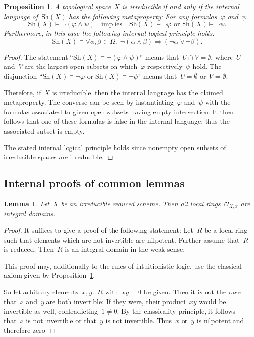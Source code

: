 \documentclass[10pt]{amsart}
\theoremstyle{definition}
\theoremstyle{plain}
\newtheorem{prop}[defn]{Proposition}
\newtheorem{lemma}[defn]{Lemma}
\theoremstyle{remark}
\renewcommand{\O}{\mathcal{O}}
\newcommand{\Sh}{\mathrm{Sh}}
\newcommand{\?}{\,{:}\,}
\renewcommand{\_}{\mathpunct{.}\,}
\begin{document}
\begin{prop}\label{prop:irreducibility-internally}
A topological space~$X$ is irreducible if and only if the internal
language of~$\Sh(X)$ has the following metaproperty: For any
formulas~$\varphi$ and~$\psi$
\[ \Sh(X) \models \neg(\varphi \wedge \psi)
  \quad\text{implies}\quad
  \Sh(X) \models \neg\varphi \text{ or }
  \Sh(X) \models \neg\psi. \]
Furthermore, in this case the following internal logical principle holds:
\[ \Sh(X) \models \forall \alpha,\beta \in \Omega\_
  \neg(\alpha \wedge \beta) \Rightarrow (\neg\alpha \vee \neg\beta). \]
\end{prop}
\begin{proof}The statement ``$\Sh(X) \models \neg(\varphi \wedge \psi)$'' means
that~$U \cap V = \emptyset$, where~$U$ and~$V$ are the largest open subsets on
which~$\varphi$ respectively~$\psi$ hold. The disjunction ``$\Sh(X) \models
\neg\varphi$ or $\Sh(X) \models \neg\psi$'' means that~$U = \emptyset$ or~$V =
\emptyset$.

Therefore, if~$X$ is irreducible, then the internal language has the claimed metaproperty. The converse
can be seen by instantiating~$\varphi$ and~$\psi$ with the formulas associated
to given open subsets having empty intersection. It then follows that one of
these formulas is false in the internal language; thus the associated subset is
empty.

The stated internal logical principle holds since nonempty open subsets of irreducible spaces are
irreducible.
\end{proof}


\subsection{Internal proofs of common lemmas}

\begin{lemma}Let~$X$ be an irreducible reduced scheme. Then all local
rings~$\O_{X,x}$ are integral domains.\end{lemma}
\begin{proof}It suffices to give a proof of the following statement: Let~$R$ be
a local ring such that elements which are not invertible are nilpotent. Further
assume that~$R$ is reduced. Then~$R$ is an integral domain in the weak sense.

This proof may, additionally to the rules of intuitionistic logic, use the
classical axiom given by Proposition~\ref{prop:irreducibility-internally}.

So let arbitrary elements~$x,y \? R$ with~$xy = 0$ be given. Then it is not the
case that~$x$ and~$y$ are both invertible: If they were, their product~$xy$
would be invertible as well, contradicting~$1 \neq 0$. By the classicality
principle, it follows that~$x$ is not invertible or that~$y$ is not invertible.
Thus~$x$ or~$y$ is nilpotent and therefore zero.
\end{proof}
\end{document}
